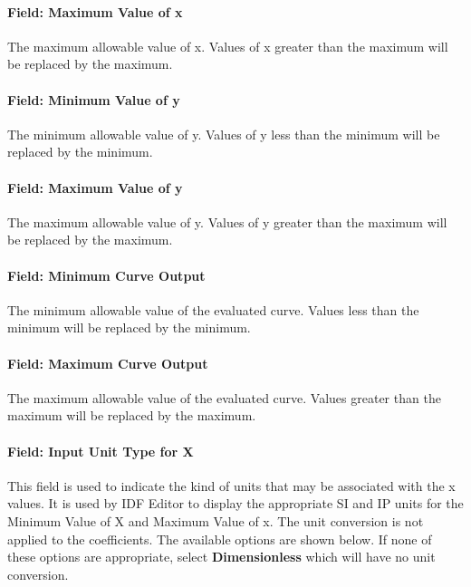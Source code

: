 \paragraph{Field: Maximum Value of x}\label{field-maximum-value-of-x-8}

The maximum allowable value of x. Values of x greater than the maximum will be replaced by the maximum.

\paragraph{Field: Minimum Value of y}\label{field-minimum-value-of-y-2}

The minimum allowable value of y. Values of y less than the minimum will be replaced by the minimum.

\paragraph{Field: Maximum Value of y}\label{field-maximum-value-of-y-2}

The maximum allowable value of y. Values of y greater than the maximum will be replaced by the maximum.

\paragraph{Field: Minimum Curve Output}\label{field-minimum-curve-output-6}

The minimum allowable value of the evaluated curve. Values less than the minimum will be replaced by the minimum.

\paragraph{Field: Maximum Curve Output}\label{field-maximum-curve-output-5}

The maximum allowable value of the evaluated curve. Values greater than the maximum will be replaced by the maximum.

\paragraph{Field: Input Unit Type for X}\label{field-input-unit-type-for-x-7}

This field is used to indicate the kind of units that may be associated with the x values. It is used by IDF Editor to display the appropriate SI and IP units for the Minimum Value of X and Maximum Value of x. The unit conversion is not applied to the coefficients. The available options are shown below. If none of these options are appropriate, select \textbf{Dimensionless} which will have no unit conversion.

